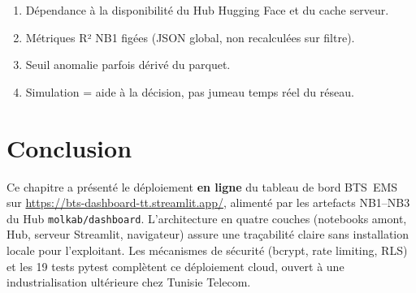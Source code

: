 \begin{enumerate}
  \item Dépendance à la disponibilité du Hub Hugging Face et du cache serveur.
  \item Métriques R² NB1 figées (JSON global, non recalculées sur filtre).
  \item Seuil anomalie parfois dérivé du parquet.
  \item Simulation = aide à la décision, pas jumeau temps réel du réseau.
\end{enumerate}

\section{Conclusion}
\label{sec:dep-conclusion}

Ce chapitre a présenté le déploiement \textbf{en ligne} du tableau de bord
BTS~EMS sur \url{https://bts-dashboard-tt.streamlit.app/}, alimenté par les
artefacts NB1--NB3 du Hub \texttt{molkab/dashboard}. L'architecture en quatre
couches (notebooks amont, Hub, serveur Streamlit, navigateur) assure une
traçabilité claire sans installation locale pour l'exploitant. Les mécanismes
de sécurité (bcrypt, rate limiting, RLS) et les 19 tests pytest complètent ce
déploiement cloud, ouvert à une industrialisation ultérieure chez Tunisie Telecom.
